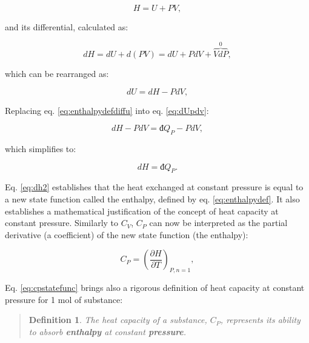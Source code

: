 \documentclass[
  9pt,
]{extbook}
\theoremstyle{definition}
\newtheorem{definition}{Definition}[chapter]
\theoremstyle{definition}
\theoremstyle{definition}
\theoremstyle{remark}
\begin{document}
\begin{equation}
  H = U + PV,
  \label{eq:enthalpydef}
\end{equation}

and its differential, calculated as:

\begin{equation}
  dH = dU + d(PV) = dU + PdV + \overbrace{VdP}^{0},
  \label{eq:enthalpydefdiff}
\end{equation}

which can be rearranged as:

\begin{equation}
  dU = dH -PdV,
  \label{eq:enthalpydefdiffu}
\end{equation}

Replacing eq. \eqref{eq:enthalpydefdiffu} into eq. \eqref{eq:dUpdv}:

\begin{equation}
  dH -PdV = đ Q_P - PdV,
  \label{eq:dh1}
\end{equation}

which simplifies to:

\begin{equation}
  dH = đ Q_P.
  \label{eq:dh2}
\end{equation}

Eq. \eqref{eq:dh2} establishes that the heat exchanged at constant pressure is equal to a new state function called the enthalpy, defined by eq. \eqref{eq:enthalpydef}. It also establishes a mathematical justification of the concept of heat capacity at constant pressure. Similarly to \(C_V\), \(C_P\) can now be interpreted as the partial derivative (a coefficient) of the new state function (the enthalpy):

\begin{equation}
  C_P = \left( \frac{\partial H} {\partial T} \right)_{P,n=1},
  \label{eq:cpstatefunc}
\end{equation}

Eq. \eqref{eq:cpstatefunc} brings also a rigorous definition of heat capacity at constant pressure for 1 mol of substance:

\begin{quote}
\begin{definition}
\protect\hypertarget{def:newdefcp}{}{\label{def:newdefcp} }\emph{The heat capacity of a substance, \(C_P\), represents its ability to absorb \textbf{enthalpy} at constant \textbf{pressure}.}
\end{definition}
\end{quote}
\end{document}
